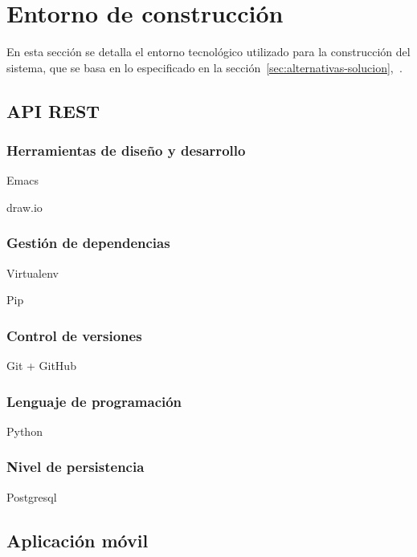 

\section{Entorno de construcción}

En esta sección se detalla el entorno tecnológico utilizado para la construcción
del sistema, que se basa en lo especificado en la
sección~\ref{sec:alternativas-solucion},\textit{~}.

\subsection{API REST}
\label{subsec:entorno-aplicacion-web}

\subsubsection{Herramientas de diseño y desarrollo}

Emacs

draw.io

\subsubsection{Gestión de dependencias}
\label{subsec:gestion-dependencias}

Virtualenv

Pip


\subsubsection{Control de versiones}

Git + GitHub


\subsubsection{Lenguaje de programación}

Python

\subsubsection{Nivel de persistencia}

Postgresql

\subsection{Aplicación móvil}


